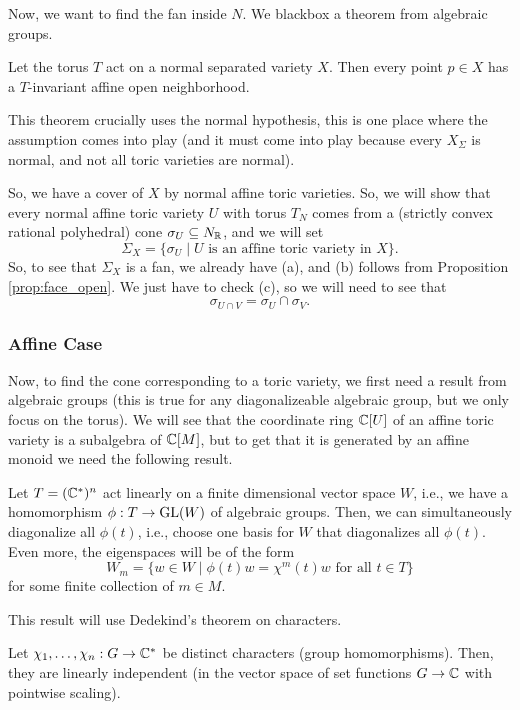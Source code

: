 \documentclass[12pt]{article}
\begin{document}
Now, we want to find the fan inside $N$. We blackbox a theorem from algebraic groups.
\begin{thm}[Sumihiro]
    Let the torus $T$ act on a normal separated variety $X$. Then every point $p\in X$ has a $T$-invariant affine open neighborhood.
\end{thm}

This theorem crucially uses the normal hypothesis, this is one place where the assumption comes into play (and it must come into play because every $X_\Sigma$ is normal, and not all toric varieties are normal).

So, we have a cover of $X$ by normal affine toric varieties. So, we will show that every normal affine toric variety $U$ with torus $T_N$ comes from a (strictly convex rational polyhedral) cone $\sigma_U \subseteq N_{\mathbb{R}}$, and we will set
\[\Sigma_X = \{\sigma_U \mid U \text{ is an affine toric variety in } X\}.\]
So, to see that $\Sigma_X$ is a fan, we already have (a), and (b) follows from Proposition \ref{prop:face_open}. We just have to check (c), so we will need to see that
\[\sigma_{U\cap V} = \sigma_U \cap \sigma_V.\]

\subsubsection{Affine Case}
Now, to find the cone corresponding to a toric variety, we first need a result from algebraic groups (this is true for any diagonalizeable algebraic group, but we only focus on the torus). We will see that the coordinate ring $\mathbb{C}[U]$ of an affine toric variety is a subalgebra of $\mathbb{C}[M]$, but to get that it is generated by an affine monoid we need the following result.
\begin{lem}\label{lem:rational_torus_reps}
    Let $T=(\mathbb{C}^*)^n$ act linearly on a finite dimensional vector space $W$, i.e., we have a homomorphism $\phi: T\to \GL(W)$ of algebraic groups. Then, we can simultaneously diagonalize all $\phi(t)$, i.e., choose one basis for $W$ that diagonalizes all $\phi(t)$. Even more, the eigenspaces will be of the form
    \[W_m = \{w\in W \mid \phi(t)w = \chi^m(t) w \text{ for all } t\in T\}\]
    for some finite collection of $m\in M$.
\end{lem}

This result will use Dedekind's theorem on characters.
\begin{thm}[Dedekind]
    Let $\chi_1,\dots,\chi_n: G\to \mathbb{C}^*$ be distinct characters (group homomorphisms). Then, they are linearly independent (in the vector space of set functions $G\to \mathbb{C}$ with pointwise scaling).
\end{thm}
\end{document}
